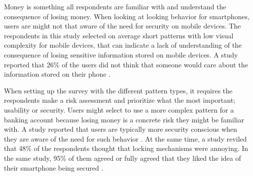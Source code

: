     Money is something all respondents are familiar with and understand the consequence of losing money. When looking at looking behavior for smartphones, users are might not that aware of the need for security on mobile devices. The respondents in this study selected on average short patterns with low visual complexity for mobile devices, that can indicate a lack of understanding of the consequence of losing sensitive information stored on mobile devices. A study reported that 26\% of the users did not think that someone would care about the information stored on their phone \cite{Egelman}. 

    When setting up the survey with the different pattern types, it requires the respondents make a risk assessment and prioritize what the most important; usability or security. Users might select to use a more complex pattern for a banking account because losing money is a concrete risk they might be familiar with. A study reported that users are typically more security conscious when they are aware of the need for such behavior \cite{Sasse}. At the same time, a study reviled that 48\% of the respondents thought that locking mechanisms were annoying. In the same study, 95\% of them agreed or fully agreed that they liked the idea of their smartphone being secured \cite{habits3}. 

